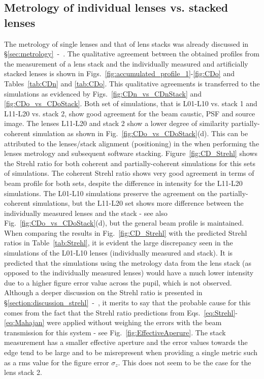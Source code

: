 \begin{refsection}
\subsection{Metrology of individual lenses vs. stacked lenses}\label{sec:stacking}

The metrology of single lenses and that of lens stacks was already discussed in \S\ref{sec:metrology}~-~\textit{}. The qualitative agreement between the obtained profiles from the measurement of a lens stack and the individually measured and artificially stacked lenses is shown in Figs.~\ref{fig:accumulated_profile_1}-\ref{fig:CDo} and Tables~\ref{tab:CDn} and \ref{tab:CDo}. This qualitative agreements is transferred to the simulations as evidenced by Figs.~\ref{fig:CDn_vs_CDnStack} and \ref{fig:CDo_vs_CDoStack}. Both set of simulations, that is L01-L10 vs. stack 1 and L11-L20 vs. stack 2, show good agreement for the beam caustic, PSF and source image. The lenses L11-L20 and stack 2 show a lower degree of similarity partially-coherent simulation as shown in Fig.~\ref{fig:CDo_vs_CDoStack}(d). This can be attributed to the lenses/stack alignment (positioning) in the when performing the lenses metrology and subsequent software stacking. Figure~\ref{fig:CD_Strehl} shows the Strehl ratio for both coherent and partially-coherent simulations for this sets of simulations. The coherent Strehl ratio shows very good agreement in terms of beam profile for both sets, despite the difference in intensity for the L11-L20 simulations. The L01-L10 simulations preserve the agreement on the partially-coherent simulations, but the L11-L20 set shows more difference between the individually measured lenses and the stack - see also Fig.~\ref{fig:CDo_vs_CDoStack}(d), but the general beam profile is maintained. When comparing the results in Fig.~\ref{fig:CD_Strehl} with the predicted Strehl ratios in Table~\ref{tab:Strehl}, it is evident the large discrepancy seen in the simulations of the L01-L10 lenses (individually measured and stack). It is predicted that the simulations using the metrology data from the lens stack (as opposed to the individually measured lenses) would have a much lower intensity due to a higher figure error value across the pupil, which is not observed. Although a deeper discussion on the Strehl ratio is presented in \S\ref{section:discussion_strehl}~-~\textit{}, it merits to say that the probable cause for this comes from the fact that the Strehl ratio predictions from Eqs.~\ref{eq:Strehl}-\ref{eq:Mahajan} were applied without weighing the errors with the beam transmission for this system - see Fig.~\ref{fig:EffectiveAperure}. The stack measurement has a smaller effective aperture and the error values towards the edge tend to be large and to be misrepresent when providing a single metric such as a rms value for the figure error $\sigma_z$. This does not seem to be the case for the lens stack 2.


\end{refsection}
